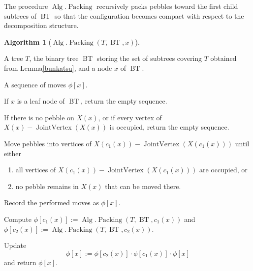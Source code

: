 \documentclass[letter,11pt]{article}
\theoremstyle{definition}
\theoremstyle{definition}
\newtheorem{alg}{Algorithm}
\DeclareMathOperator{\BT}{BT}
\DeclareMathOperator{\Alg}{Alg}
\DeclareMathOperator{\JoiV}{JointVertex}
\DeclareMathOperator{\Pac}{Packing}
\newcommand{\1}{\boldmath$~1~$\unboldmath}
\newcommand{\tume}{\hspace*{0.2em}}
\newcommand{\maru}[1]{{\ooalign{\hfill$\small#1$\hfill\crcr\scalebox{1.3}{$\bigcirc$}}}}
\newenvironment{alg-enumerate}{%
  \begin{enumerate}%
   \renewcommand{\theenumi}{\arabic{enumi}}%
   \renewcommand{\labelenumi}{\rm{{\maru{\theenumi}}\tume\/}}%
   \renewcommand{\labelenumii}{\rm{$(${\maru{\theenumi}}-\theenumii$)$\tume\/}}%
 }{\end{enumerate}%
}
\newcommand{\namelistlabel}[1]{\hspace*{10pt}\mbox{#1}:\hspace{\fill}}
\newenvironment{namelist}[1]{%
    \begin{list}{}
      {\let\makelabel\namelistlabel
      \settowidth{\labelwidth}{#1}
      \setlength{\leftmargin}{1.1\labelwidth}
      \setlength{\labelsep}{5pt}
      \setlength{\parsep}{0pt}}
  }{%
  \end{list}}
\begin{document}
The procedure $\Alg.\Pac$ recursively packs pebbles toward the first
child subtrees of $\BT$ so that the configuration becomes compact
with respect to the decomposition structure.
\begin{alg}[$\Alg.\Pac(T,\BT,x)$]\hfill
\begin{namelist}{OUTPUT}

\item[\sl Input]
A tree $T$, the binary tree $\BT$ storing the set of subtrees covering
$T$ obtained from Lemma\tume\ref{bunkatsu},
and a node $x$ of $\BT$.

\item[\sl Output]
A sequence of moves $\phi[x]$.

\end{namelist}

\begin{alg-enumerate}

\item
If $x$ is a leaf node of $\BT$, return the empty sequence.

If there is no pebble on $X(x)$, or
if every vertex of $X(x)-\JoiV(X(x))$ is occupied,
return the empty sequence.

\item
Move pebbles into vertices of 
$X(c_1(x))-\JoiV(X(c_1(x)))$ 
until either
\begin{enumerate}
\item all vertices of $X(c_1(x))-\JoiV(X(c_1(x)))$ are occupied, or  
\item no pebble remains in $X(x)$ that can be moved there.
\end{enumerate}
Record the performed moves as $\phi[x]$.

\item
Compute $\phi[c_1(x)] := \Alg.\Pac(T,\BT,c_1(x))$
and $\phi[c_2(x)] := \Alg.\Pac(T,\BT,c_2(x))$.

\item
Update
\[
\phi[x] := \phi[c_2(x)]\cdot\phi[c_1(x)]\cdot\phi[x]
\]
and return $\phi[x]$.

\end{alg-enumerate}
\end{alg}
\end{document}

